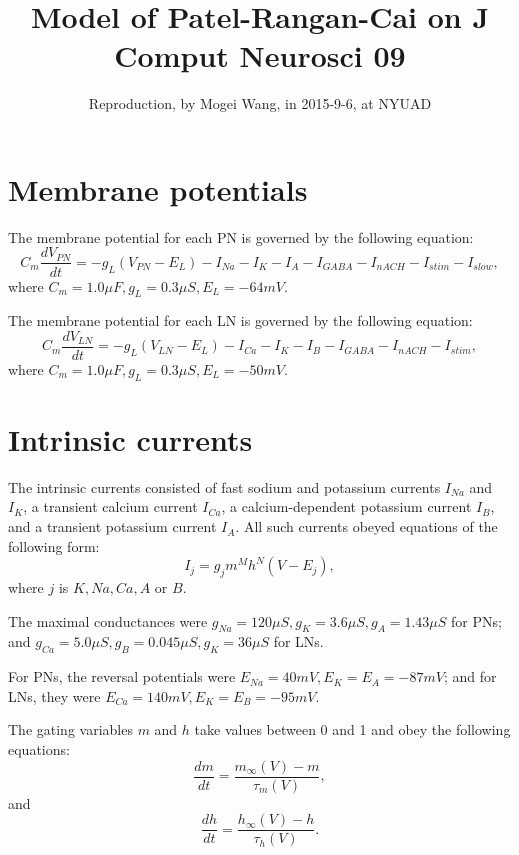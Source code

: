 \documentclass[12pt, a4paper]{article}%
\begin{document}
\newcommand{\lr}[1]{\langle #1 \rangle}
\newcommand{\llr}[1]{\langle \hspace{-2.5pt} \langle #1 \rangle \hspace{-2.5pt} \rangle}

\title{Model of Patel-Rangan-Cai on J Comput Neurosci 09}%
\vspace{-30mm} \author{Reproduction, by Mogei Wang, in 2015-9-6, at NYUAD} \date{} \maketitle

\section{Membrane potentials}%

The membrane potential for each PN is governed by the following equation:
$$ C_{m}\frac{dV_{PN}}{dt} = -g_{L}(V_{PN}-E_{L}) -I_{Na} -I_{K} -I_{A} -I_{GABA} -I_{nACH} -I_{stim} -I_{slow}, $$
where $C_{m}=1.0\mu F, g_{L}=0.3\mu S, E_{L}=-64mV$.

The membrane potential for each LN is governed by the following equation:
$$ C_{m}\frac{dV_{LN}}{dt} = -g_{L}(V_{LN}-E_{L}) -I_{Ca} -I_{K} -I_{B} -I_{GABA} -I_{nACH} -I_{stim}, $$
where $C_{m}=1.0\mu F, g_{L}=0.3\mu S, E_{L}=-50mV$.

\section{Intrinsic currents}%
The intrinsic currents consisted of fast sodium and potassium currents $I_{Na}$ and $I_{K}$, a transient calcium current $I_{Ca}$, a calcium-dependent potassium current $I_{B}$, and a transient potassium current $I_{A}$. All such currents obeyed equations of the following form:
$$ I_{j} =g_{j}m^{M}h^{N}(V-E_{j}), $$ where $j$ is $K, Na, Ca, A$ or $B$.

The maximal conductances were $g_{Na} = 120 \mu S, g_{K} = 3.6 \mu S, g_{A} = 1.43 \mu S$ for PNs; and $g_{Ca} = 5.0 \mu S, g_{B} = 0.045 \mu S, g_{K} = 36 \mu S$ for LNs.

For PNs, the reversal potentials were $E_{Na} = 40 mV,  E_{K} = E_{A} = -87 mV$; and for LNs, they were $E_{Ca} = 140 mV, E_{K} = E_{B} = -95 mV$.

The gating variables $m$ and $h$ take values between 0 and 1 and obey the following equations:
$$ \frac{dm}{dt} = \frac{m_{\infty}(V)-m}{\tau_{m}(V)}, $$
and
$$ \frac{dh}{dt} = \frac{h_{\infty}(V)-h}{\tau_{h}(V)}. $$
\end{document}
